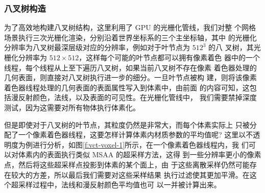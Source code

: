\subsubsection{八叉树构造}
为了高效地构建八叉树结构，这里利用了 GPU 的光栅化管线，我们对整 个网格场景执行三次光栅化渲染，分别沿着世界坐标系的三个主坐标轴，其中 的光栅化分辨率为八叉树最深层级对应的分辨率，例如对于叶节点为 $512^{3}$ 的八 叉树，其光栅化分辨率为 $512\times  512$，这样每个可能的叶节点都可以拥有像素着色 器中的一个线程，每个线程从上至下遍历八叉树，如果当前八叉树不存在像素 着色器处理的几何表面，则直接对八叉树执行进一步的细分。一旦叶节点被构 建，则将该像素着色器线程处理的几何表面的表面属性写入到体素中，由前面 的内容可知，这包括漫反射颜色，法线，以及表面的可见性。在光栅化管线中， 我们需要禁掉深度测试，因为这需要对所有物体执行体素化。

但是即使对于八叉树的叶节点，其粒度仍然是非常大，而每个体素实际上 只被分配了一个像素着色器线程，这要怎样计算体素内材质参数的平均值呢? 这里以不透明度为例进行分析，如图\ref{f:vct-voxel-1}所示，在一个像素着色器线程内，我 们可以对体素内的表面执行类似 MSAA 的超采样方法\cite{a:Practicalreal-timevoxelbasedglobalilluminationforcurrentgpus}，这得 到一些分辨率更小的像素点，然后将这些超采样点投影到体素的某个面上，由 于这些离散采样仍然可能存在较大的方差，所以最后我们需要对这些采样结果 执行过滤使其更加平滑。在这个超采样过程中，法线和漫反射颜色平均值也可 以一并被计算出来。

